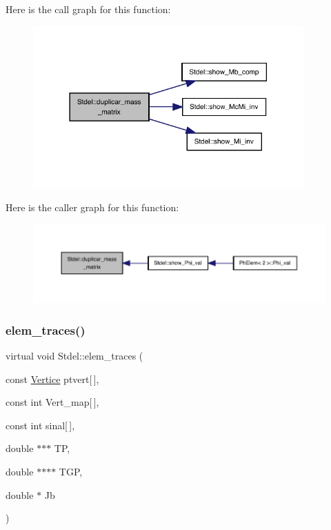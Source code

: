 Here is the call graph for this function\+:
\nopagebreak
\begin{figure}[H]
\begin{center}
\leavevmode
\includegraphics[width=294pt]{classStdel_a922b779be1f8f12b7a5535ab529bff64_cgraph}
\end{center}
\end{figure}
Here is the caller graph for this function\+:
\nopagebreak
\begin{figure}[H]
\begin{center}
\leavevmode
\includegraphics[width=350pt]{classStdel_a922b779be1f8f12b7a5535ab529bff64_icgraph}
\end{center}
\end{figure}
\mbox{\label{classStdel_a3d72869352a2ff5eeb23972eca3b391e}} 
\subsubsection{\texorpdfstring{elem\+\_\+traces()}{elem\_traces()}}
{\footnotesize\ttfamily virtual void Stdel\+::elem\+\_\+traces (\begin{DoxyParamCaption}\item[{const \hyperlink{structVertice}{Vertice}}]{ptvert\mbox{[}$\,$\mbox{]},  }\item[{const int}]{Vert\+\_\+map\mbox{[}$\,$\mbox{]},  }\item[{const int}]{sinal\mbox{[}$\,$\mbox{]},  }\item[{double $\ast$$\ast$$\ast$}]{TP,  }\item[{double $\ast$$\ast$$\ast$$\ast$}]{T\+GP,  }\item[{double $\ast$}]{Jb }\end{DoxyParamCaption})\hspace{0.3cm}{\ttfamily [pure virtual]}}



